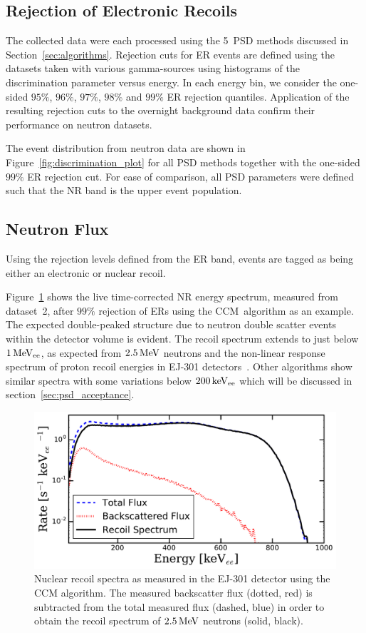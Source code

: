 \subsection{Rejection of Electronic Recoils}
The collected data were each processed using the 5~PSD methods discussed in Section~\ref{sec:algorithms}. Rejection cuts for ER events are defined using the datasets taken with various gamma-sources using histograms of the discrimination parameter versus energy. In each energy bin, we consider the one-sided $95\%$, $96\%$, $97\%$, $98\%$ and $99\%$ ER rejection quantiles. Application of the resulting rejection cuts to the overnight background data confirm their performance on neutron datasets.

The event distribution from neutron data are shown in Figure~\ref{fig:discrimination_plot} for all PSD methods together with the one-sided $99\%$ ER rejection cut. For ease of comparison, all PSD parameters were defined such that the NR band is the upper event population.

\subsection{Neutron Flux}

Using the rejection levels defined from the ER band, events are tagged as being either an electronic or nuclear recoil.

Figure~\ref{fig:psd_rateplot} shows the live time-corrected NR energy spectrum, measured from dataset~2, after $99\%$ rejection of ERs using the CCM~algorithm as an example. The expected double-peaked structure due to neutron double scatter events within the detector volume is evident.
The recoil spectrum extends to just below $1\,\mathrm{MeV_{ee}}$, as expected from $2.5\,\mathrm{MeV}$ neutrons and the non-linear response spectrum of proton recoil energies in EJ-301 detectors~\cite{Verbinski:1968,Aksoy:1994,Naqvi:1993}. Other algorithms show similar spectra with some variations below $200\,\mathrm{keV_{ee}}$ which will be discussed in section~\ref{sec:psd_acceptance}.


\begin{figure}[htb]
\centering
    \includegraphics[width=\textwidth]{figures/psd/fig_rate_hists}
    \caption{Nuclear recoil spectra as measured in the EJ-301 detector using the CCM algorithm. The measured backscatter flux (dotted, red) is subtracted from the total measured flux (dashed, blue) in order to obtain the recoil spectrum of $2.5\,\mathrm{MeV}$ neutrons (solid, black).}\label{fig:psd_rateplot}
\end{figure}

